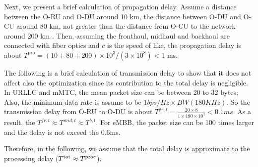 \documentclass[lettersize,journal]{IEEEtran}
\begin{document}
Next, we present a brief calculation of propagation delay.
Assume a distance between the O-RU and O-DU around 10 km, the distance between O-DU and O-CU around 80 km, not greater than the distance from O-CU to the network around 200 km \cite{oranD1}. Then, assuming the fronthaul, midhaul and backhaul are connected with fiber optics and $c$ is the speed of like, the propagation delay is about $T^{\text{pro}} = (10 + 80 + 200)\times 10^3 /(3\times 10^8) < 1$ ms.

The following is a brief calculation of transmission delay to show that it does not affect also the optimization since its contribution to the total delay is negligible.
In URLLC and mMTC, the mean packet size can be between 20 to 32 bytes; Also, the minimum data rate is assume to be $1 bps/Hz \times BW (180 KHz)$. So the transmission delay from O-RU to O-DU is about $T^{fr,t} = \frac{20\times 8}{1 \times 180 \times 10^3} < 0.1 ms$. As a result, the $T^{fr,t} \approx T^{mid,t} \approx T^{b,t}$. For eMBB, the packet size can be 100 times larger and the delay is not exceed the 0.6ms.


Therefore, in the following, we assume that the total delay is approximate to the processing delay ($T^{\text{\text{tot}}} \approx T^{\text{proc}}$).
\end{document}
